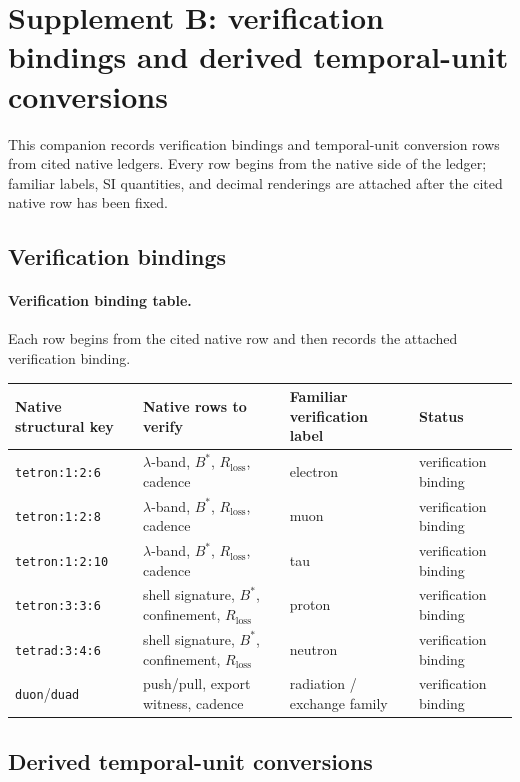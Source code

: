 \section{Supplement B: verification bindings and derived temporal-unit conversions}\label{app:application-si}

This companion records verification bindings and temporal-unit conversion rows from cited native ledgers. Every row begins from the native side of the ledger; familiar labels, SI quantities, and decimal renderings are attached after the cited native row has been fixed.

\subsection{Verification bindings}\label{app:familiar-bindings}
\paragraph{Verification binding table.} Each row begins from the cited native row and then records the attached verification binding.

\begin{center}
\begin{tabularx}{\linewidth}{@{}lXXl@{}}
\toprule
Native structural key & Native rows to verify & Familiar verification label & Status \\
\midrule
\texttt{tetron:1:2:6} & $\lambda$-band, $B^*$, $R_{\mathrm{loss}}$, cadence & electron & verification binding \\
\texttt{tetron:1:2:8} & $\lambda$-band, $B^*$, $R_{\mathrm{loss}}$, cadence & muon & verification binding \\
\texttt{tetron:1:2:10} & $\lambda$-band, $B^*$, $R_{\mathrm{loss}}$, cadence & tau & verification binding \\
\texttt{tetron:3:3:6} & shell signature, $B^*$, confinement, $R_{\mathrm{loss}}$ & proton & verification binding \\
\texttt{tetrad:3:4:6} & shell signature, $B^*$, confinement, $R_{\mathrm{loss}}$ & neutron & verification binding \\
\texttt{duon}/\texttt{duad} & push/pull, export witness, cadence & radiation / exchange family & verification binding \\
\bottomrule
\end{tabularx}
\end{center}

\subsection{Derived temporal-unit conversions}\label{app:si-routing}
